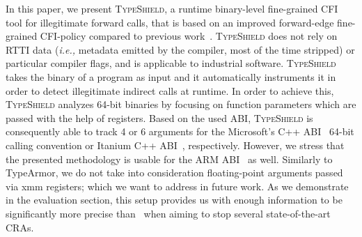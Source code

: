 In this paper, we present \textsc{TypeShield}, a runtime binary-level fine-grained CFI tool for illegitimate forward calls, 
that is based on an improved forward-edge fine-grained CFI-policy 
compared to previous work~\cite{veen:typearmor}. 
\textsc{TypeShield} does not rely on RTTI data (\textit{i.e.,} metadata emitted by the compiler, most of the time stripped) or 
particular compiler flags, and is applicable to industrial software.
\textsc{TypeShield} takes the binary of a program as input and it automatically instruments it in order
to detect illegitimate indirect calls at runtime. In order to achieve this, 
\textsc{TypeShield} analyzes 64-bit binaries by focusing on function parameters which are passed with the 
help of registers. Based on the used ABI, \textsc{TypeShield} is consequently able to track 4 or 6 arguments for the Microsoft's C++ ABI~\cite{microsoft:abi} 64-bit calling convention or 
Itanium C++ ABI~\cite{itanium:abi}, 
respectively. However, we stress that the presented methodology is usable for the ARM ABI~\cite{arm:abi} as well.
Similarly to TypeArmor, we do not take into consideration floating-point arguments passed via xmm registers; which we want to address in future work. 
As we demonstrate in the evaluation section, this setup provides us with enough information to be significantly more precise than~\cite{veen:typearmor} when aiming to stop several state-of-the-art CRAs.

